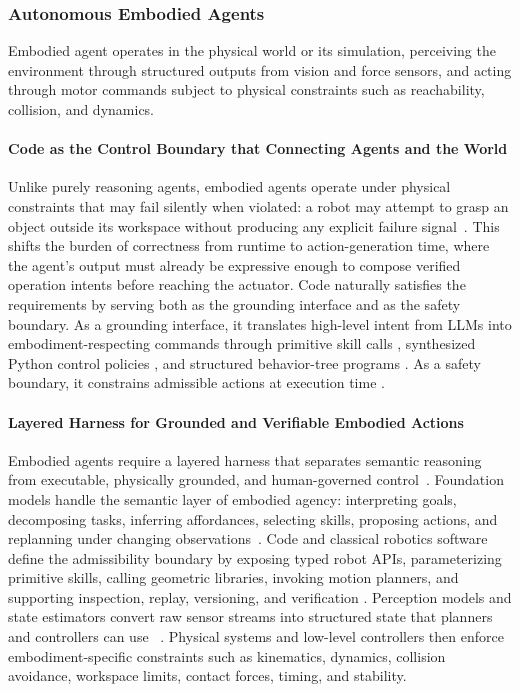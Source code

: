 \documentclass{llmxive}
\begin{document}
\subsubsection{Autonomous Embodied Agents}

Embodied agent operates in the physical world or its simulation, perceiving the environment through structured outputs from vision and force sensors, and acting through motor commands subject to physical constraints such as reachability, collision, and dynamics.

\paragraph{Code as the Control Boundary that Connecting Agents and the World}
Unlike purely reasoning agents, embodied agents operate under physical constraints that may fail silently when violated: a robot may attempt to grasp an object outside its workspace without producing any explicit failure signal~\citep{liang2023codepolicieslanguagemodel}. This shifts the burden of correctness from runtime to action-generation time, where the agent's output must already be expressive enough to compose verified operation intents before reaching the actuator. 
Code naturally satisfies the requirements by serving both as the grounding interface and as the safety boundary. As a grounding interface, it translates high-level intent from LLMs into embodiment-respecting commands through primitive skill calls \citep{ahn2022can, ren2023robots, zhai2026skillvla, zhang2023bootstrap}, synthesized Python control policies \citep{liang2023code, mu2024robocodex, xie2025robotic, wang2025llm, ji2026genswarm}, and structured behavior-tree programs \citep{zhang2025codebt}. As a safety boundary, it constrains admissible actions at execution time \citep{guan2025normcode, szeider2025cp, miculicich2025veriguard}.

\paragraph{Layered Harness for Grounded and Verifiable Embodied Actions} 
Embodied agents require a layered harness that separates semantic reasoning from executable, physically grounded, and human-governed control~\citep{vemprala2024chatgpt}. Foundation models handle the semantic layer of embodied agency: interpreting goals, decomposing tasks, inferring affordances, selecting skills, proposing actions, and replanning under changing observations~\citep{huang2022inner, wang2023voyager}.  Code and classical robotics software define the admissibility boundary by exposing typed robot APIs, parameterizing primitive skills, calling geometric libraries, invoking motion planners, and supporting inspection, replay, versioning, and verification \citep{xie2025robotic, liang2023code, huang2023voxposer, macenski2020nav2}. Perception models and state estimators convert raw sensor streams into structured state that planners and controllers can use ~\citep{driess2023palme, deepmind2025geminirobotics}. Physical systems and low-level controllers then enforce embodiment-specific constraints such as kinematics, dynamics, collision avoidance, workspace limits, contact forces, timing, and stability. 
\end{document}
